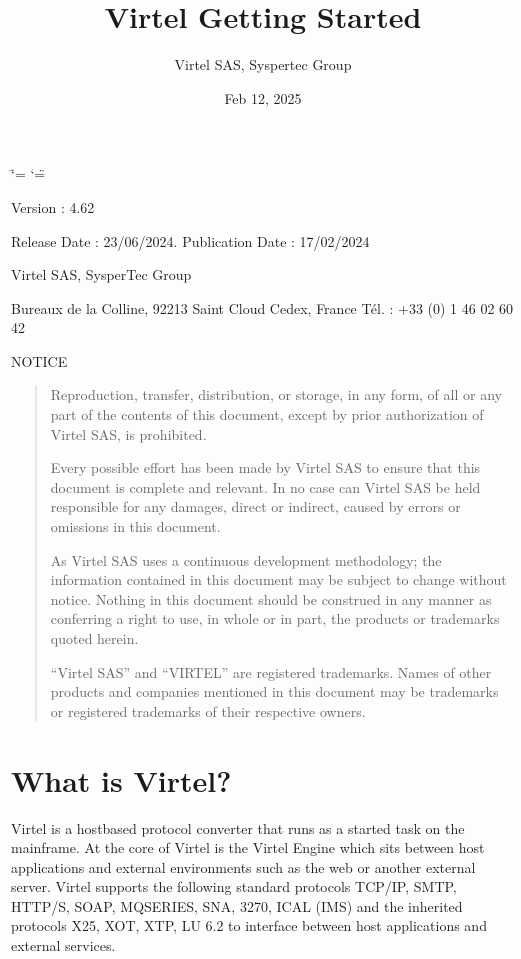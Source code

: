\documentclass[letterpaper,10pt,english]{sphinxmanual}
\title{Virtel Getting Started}
\date{Feb 12, 2025}
\author{Virtel SAS, Syspertec Group}
\begin{document}
\ifdefined\shorthandoff
  \ifnum\catcode`\=\string=\active\shorthandoff{=}\fi
  \ifnum\catcode`\"=\active{}\fi
\fi

\pagestyle{empty}
\sphinxmaketitle
\pagestyle{plain}
\sphinxtableofcontents
\pagestyle{normal}
\label{\detokenize{Getting_Started::doc}}


\sphinxAtStartPar
{}

\sphinxAtStartPar
Version : 4.62

\sphinxAtStartPar
Release Date : 23/06/2024. Publication Date : 17/02/2024

\sphinxAtStartPar
Virtel SAS, SysperTec Group

 Bureaux de la Colline, 92213 Saint Cloud Cedex, France Tél. : +33 (0) 1 46 02 60 42

\sphinxAtStartPar
{}

\sphinxAtStartPar
NOTICE
\begin{quote}

\sphinxAtStartPar
Reproduction, transfer, distribution, or storage, in any form, of all or any part of
the contents of this document, except by prior authorization of Virtel SAS, is prohibited.

\sphinxAtStartPar
Every possible effort has been made by Virtel SAS to ensure that this document
is complete and relevant. In no case can Virtel SAS be held responsible for
any damages, direct or indirect, caused by errors or omissions in this document.

\sphinxAtStartPar
As Virtel SAS uses a continuous development methodology; the information
contained in this document may be subject to change without notice. Nothing in this
document should be construed in any manner as conferring a right to use, in whole or in
part, the products or trademarks quoted herein.

\sphinxAtStartPar
“Virtel SAS” and “VIRTEL” are registered trademarks. Names of other products
and companies mentioned in this document may be trademarks or registered trademarks of
their respective owners.
\end{quote}


\chapter{What is Virtel?}
\label{\detokenize{Getting_Started:what-is-virtel}}
\sphinxAtStartPar
Virtel is a host\sphinxhyphen{}based protocol converter that runs as a started task on the mainframe. At the core of Virtel is the Virtel Engine which sits between host applications and external environments such as the web or another external server. Virtel supports the following standard protocols \sphinxhyphen{} TCP/IP, SMTP, HTTP/S, SOAP, MQ\sphinxhyphen{}SERIES, SNA, 3270, ICAL (IMS) and the inherited protocols \sphinxhyphen{} X25, XOT, XTP, LU 6.2 to interface between host applications and external services.
\end{document}

